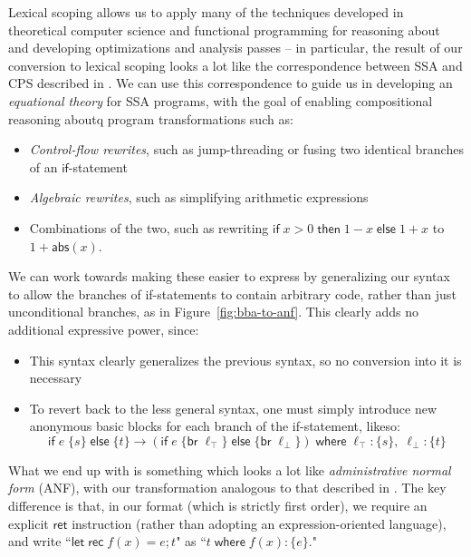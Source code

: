 \documentclass[acmsmall,screen,review]{acmart}
\newcommand{\ms}[1]{\ensuremath{\mathsf{#1}}}
\newcommand{\lto}{:}
\newcommand{\where}[2]{#1\;\ms{where}\;#2}
\newcommand{\wbranch}[3]{#1(#2) \lto \{#3\}}
\begin{document}
Lexical scoping allows us to apply many of the techniques developed in theoretical computer science
and functional programming for reasoning about and developing optimizations and analysis passes --
in particular, the result of our conversion to lexical scoping looks a lot like the correspondence
between SSA and CPS described in \citet{kelsey-95-cps}. We can use this correspondence to guide us
in developing an \textit{equational theory} for SSA programs, with the goal of enabling
compositional reasoning aboutq program transformations such as:
\begin{itemize}
  \item \textit{Control-flow rewrites}, such as jump-threading or fusing two identical branches of
  an \ms{if}-statement
  \item \textit{Algebraic rewrites}, such as simplifying arithmetic expressions
  \item Combinations of the two, such as rewriting $\ms{if}\;x > 0\;\ms{then}\;1 - x\;\ms{else}\;1 +
  x$ to $1 + \ms{abs}(x)$.
\end{itemize}
We can work towards making these easier to express by generalizing our syntax to allow the branches
of if-statements to contain arbitrary code, rather than just unconditional branches, as in
Figure~\ref{fig:bba-to-anf}. This clearly adds no additional expressive power, since:
\begin{itemize}
  \item This syntax clearly generalizes the previous syntax, so no conversion into it is necessary
  \item To revert back to the less general syntax, one must simply introduce new anonymous basic
  blocks for each branch of the if-statement, likeso:
  \begin{equation}
    \ms{if}\;e\;\{s\}\;\ms{else}\;\{t\}
    \to (\ms{if}\;e\;\{\ms{br}\;\ell_\top\}\;\ms{else}\;\{\ms{br}\;\ell_\bot\})\;
        \ms{where}\;\ell_\top: \{s\},\;\ell_\bot: \{t\}
  \end{equation}
\end{itemize}
What we end up with is something which looks a lot like \textit{administrative normal form} (ANF),
with our transformation analogous to that described in \citet{chakravarty-functional-ssa-2003}. The
key difference is that, in our format (which is strictly first order), we require an explicit
\ms{ret} instruction (rather than adopting an expression-oriented language), and write
``$\ms{let\;rec}\;f(x) = e; t$" as ``$\where{t}{\wbranch{f}{x}{e}}$."
\end{document}
